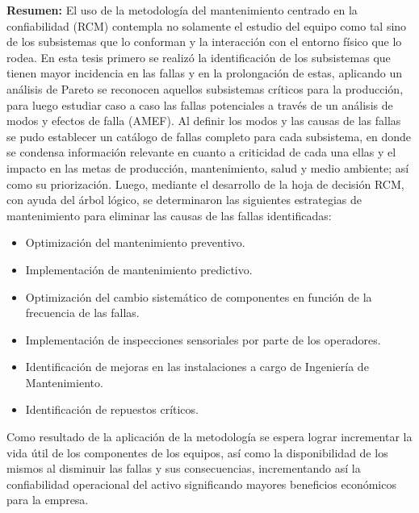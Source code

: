 \begin{description}
\item \textbf{Resumen:} El uso de la metodología del mantenimiento centrado en la confiabilidad (RCM) contempla no solamente el estudio del equipo como tal sino de los subsistemas que lo conforman y la interacción con el entorno físico que lo rodea. 
En esta tesis primero se realizó la identificación de los subsistemas que tienen mayor incidencia en las fallas y en la prolongación de estas, aplicando un análisis de Pareto se reconocen aquellos subsistemas críticos para la producción, para luego estudiar caso a caso las fallas potenciales a través de un análisis de modos y efectos de falla (AMEF). Al definir los modos y las causas de las fallas se pudo establecer un catálogo de fallas completo para cada subsistema, en donde se condensa información relevante en cuanto a criticidad de cada una ellas y el impacto en las metas de producción, mantenimiento, salud y medio ambiente; así como su priorización. Luego, mediante el desarrollo de la hoja de decisión RCM, con ayuda del árbol lógico, se determinaron las siguientes estrategias de mantenimiento para eliminar las causas de las fallas identificadas: 
\begin{itemize}
\item Optimización del mantenimiento preventivo.
\item Implementación de mantenimiento predictivo.
\item Optimización del cambio sistemático de componentes en función de la frecuencia de las fallas.
\item Implementación de inspecciones sensoriales por parte de los operadores.
\item Identificación de mejoras en las instalaciones a cargo de Ingeniería de Mantenimiento.
\item Identificación de repuestos críticos.

\end{itemize}
   
Como resultado de la aplicación de la metodología se espera lograr incrementar la vida útil de los componentes de los equipos, así como la disponibilidad de los mismos al disminuir las fallas y sus consecuencias, incrementando así la confiabilidad operacional del activo significando mayores beneficios económicos para la empresa. 
 
       
\end{description}

